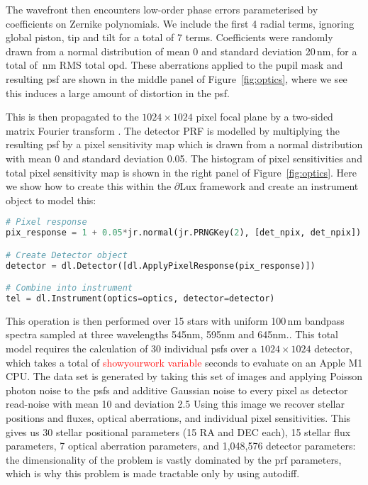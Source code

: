 \documentclass[]{spieman}
\begin{document}
The wavefront then encounters low-order phase errors parameterised by coefficients on Zernike polynomials. We include the first 4 radial terms, ignoring global piston, tip and tilt for a total of 7 terms. Coefficients were randomly drawn from a normal distribution of mean 0 and standard deviation 20\,nm, for a total of \,nm RMS total \ac{opd}. These aberrations applied to the pupil mask and resulting \ac{psf} are shown in the middle panel of Figure~\ref{fig:optics}, where we see this induces a large amount of distortion in the \ac{psf}.

This is then propagated to the $1024\times1024$ pixel focal plane by a two-sided matrix Fourier transform \cite{Soummer2007,Martinache2020}. The detector PRF is modelled by multiplying the resulting \ac{psf} by a pixel sensitivity map which is drawn from a normal distribution with mean 0 and standard deviation 0.05. The histogram of pixel sensitivities and total pixel sensitivity map is shown in the right panel of Figure~\ref{fig:optics}. Here we show how to create this within the $\partial$Lux framework and create an instrument object to model this:
\newpage
\begin{lstlisting}[language=Python,frame=single]
# Pixel response
pix_response = 1 + 0.05*jr.normal(jr.PRNGKey(2), [det_npix, det_npix])

# Create Detector object
detector = dl.Detector([dl.ApplyPixelResponse(pix_response)])

# Combine into instrument
tel = dl.Instrument(optics=optics, detector=detector)
\end{lstlisting}

This operation is then performed over 15 stars with uniform 100\,nm bandpass spectra sampled at three wavelengths 545nm, 595nm and 645nm.. This total model requires the calculation of 30 individual \ac{psf}s over a $1024\times1024$ detector, which takes a total of \textcolor{red}{showyourwork variable} seconds to evaluate on an Apple M1 CPU. The data set is generated by taking this set of images and applying Poisson photon noise to the \ac{psf}s and additive Gaussian noise to every pixel as detector read-noise with mean 10 and deviation 2.5 Using this image we recover stellar positions and fluxes, optical aberrations, and individual pixel sensitivities. This gives us 30 stellar positional parameters (15 RA and DEC each), 15 stellar flux parameters, 7 optical aberration parameters, and 1,048,576 detector parameters: the dimensionality of the problem is vastly dominated by the \ac{prf} parameters, which is why this problem is made tractable only by using autodiff.
\end{document}
